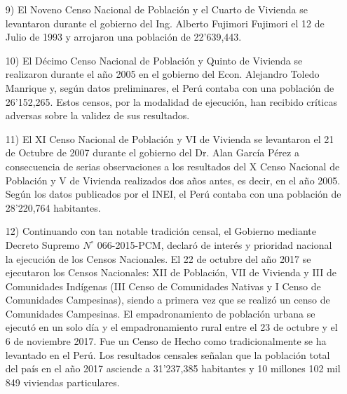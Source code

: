 \documentclass[8pt,a4paper]{beamer}
\begin{document}
{\begin{frame}{}
\begin{block}{}
\begin{enumerate}
\end{enumerate}
\end{block}
\end{frame}

\begin{frame}{}
\begin{block}{}
\begin{enumerate}
\justifying
\item[9)] El Noveno Censo Nacional de Población y el Cuarto de Vivienda se levantaron durante el gobierno del Ing. Alberto Fujimori Fujimori el 12 de Julio de 1993 y arrojaron una población de 22’639,443.
\item[10)] El Décimo Censo Nacional de Población y Quinto de Vivienda se realizaron durante el año 2005 en el gobierno del Econ. Alejandro Toledo Manrique y, según datos preliminares, el Perú contaba con una población de 26’152,265. Estos censos, por la modalidad de ejecución, han recibido críticas adversas sobre la validez de sus resultados.

\item[11)] El XI Censo Nacional de Población y VI de Vivienda se levantaron el 21 de Octubre de 2007 durante el gobierno del Dr. Alan García Pérez a consecuencia de serias observaciones a los resultados del X Censo Nacional de Población y V de Vivienda realizados dos años antes, es decir, en el año 2005. Según los datos publicados por el INEI, el Perú contaba con una población de 28’220,764 habitantes.

\end{enumerate}
\end{block}
\end{frame}

\begin{frame}{}
\begin{block}{}
\begin{enumerate}
\justifying

\item[12)] Continuando con tan notable tradición censal, el Gobierno mediante Decreto Supremo $N^{\circ}$ 066-2015-PCM, declaró de interés y prioridad nacional la ejecución de los Censos Nacionales. El 22 de octubre del año 2017 se ejecutaron los Censos Nacionales: XII de Población, VII de Vivienda y III de Comunidades Indígenas (III Censo de Comunidades Nativas y I Censo de Comunidades Campesinas), siendo a primera vez que se realizó un censo de Comunidades Campesinas. El empadronamiento de población urbana se ejecutó en un solo día y el empadronamiento rural entre el 23 de octubre y el 6 de noviembre 2017. Fue un Censo de Hecho como tradicionalmente se ha levantado en el Perú. Los resultados censales señalan que la población total del país en el año 2017 asciende a 31'237,385 habitantes y 10 millones 102 mil 849 viviendas particulares.
\end{enumerate}
\end{block}
\end{frame}

}
\end{document}
